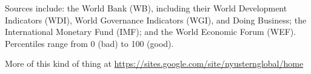 \documentclass[12pt]{article}
\begin{document}
%
\vspace{-0.15in}
Sources include:  the World Bank (WB),
including their World Development Indicators (WDI),
World Governance Indicators (WGI), and Doing Business;
the International Monetary Fund (IMF);
and the World Economic Forum (WEF).
Percentiles range from 0 (bad) to 100 (good).

\vspace*{0.1in}
More of this kind of thing at \url{https://sites.google.com/site/nyusternglobal/home}

{\vfill

}
\end{document}
